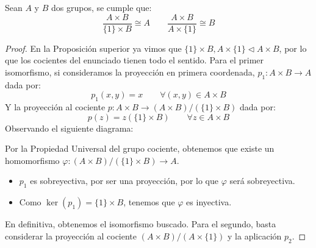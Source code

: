 \begin{prop}
    Sean $A$ y $B$ dos grupos, se cumple que:
    \begin{equation*}
        \dfrac{A\times B}{\{1\}\times B} \cong A \qquad \dfrac{A\times B}{A\times \{1\}} \cong B
    \end{equation*}
    \begin{proof}
        En la Proposición superior ya vimos que $\{1\}\times B, A\times \{1\}\lhd A\times B$, por lo que los cocientes del enunciado tienen todo el sentido. Para el primer isomorfismo, si consideramos la proyección en primera coordenada, $p_1:A\times B\to A$ dada por:
        \begin{equation*}
            p_1(x,y) = x \qquad \forall (x,y)\in A\times B
        \end{equation*}
        Y la proyección al cociente $p:A\times B\to (A\times B)/(\{1\}\times B)$ dada por:
        \begin{equation*}
            p(z) = z(\{1\}\times B) \qquad \forall z\in A\times B
        \end{equation*}
        Observando el siguiente diagrama:
        \begin{figure}[H]
            \centering
        \end{figure}
        Por la Propiedad Universal del grupo cociente, obtenemos que existe un homomorfismo $\varphi:(A\times B)/(\{1\}\times B)\to A$.
        \begin{itemize}
            \item $p_1$ es sobreyectiva, por ser una proyección, por lo que $\varphi$ será sobreyectiva.
            \item Como $\ker(p_1) = \{1\}\times B$, tenemos que $\varphi$ es inyectiva.
        \end{itemize}
        En definitiva, obtenemos el isomorfismo buscado. Para el segundo, basta considerar la proyección al cociente $(A\times B)/(A\times \{1\})$ y la aplicación $p_2$.
    \end{proof}
\end{prop}

